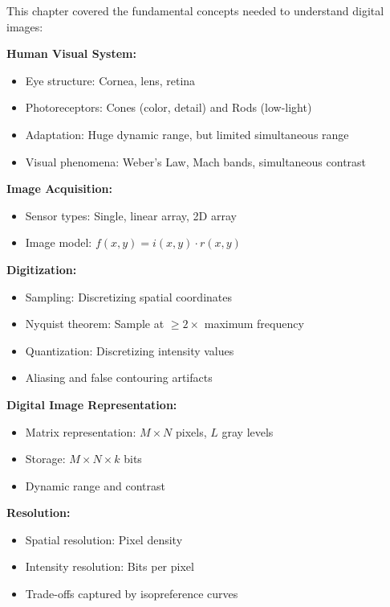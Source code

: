 \documentclass[12pt,a4paper]{article}
\begin{document}
\begin{conceptbox}
This chapter covered the fundamental concepts needed to understand digital images:

\textbf{Human Visual System:}
\begin{itemize}
    \item Eye structure: Cornea, lens, retina
    \item Photoreceptors: Cones (color, detail) and Rods (low-light)
    \item Adaptation: Huge dynamic range, but limited simultaneous range
    \item Visual phenomena: Weber's Law, Mach bands, simultaneous contrast
\end{itemize}

\textbf{Image Acquisition:}
\begin{itemize}
    \item Sensor types: Single, linear array, 2D array
    \item Image model: $f(x,y) = i(x,y) \cdot r(x,y)$
\end{itemize}

\textbf{Digitization:}
\begin{itemize}
    \item Sampling: Discretizing spatial coordinates
    \item Nyquist theorem: Sample at $\geq 2 \times$ maximum frequency
    \item Quantization: Discretizing intensity values
    \item Aliasing and false contouring artifacts
\end{itemize}

\textbf{Digital Image Representation:}
\begin{itemize}
    \item Matrix representation: $M \times N$ pixels, $L$ gray levels
    \item Storage: $M \times N \times k$ bits
    \item Dynamic range and contrast
\end{itemize}

\textbf{Resolution:}
\begin{itemize}
    \item Spatial resolution: Pixel density
    \item Intensity resolution: Bits per pixel
    \item Trade-offs captured by isopreference curves
\end{itemize}


\end{conceptbox}
\end{document}
